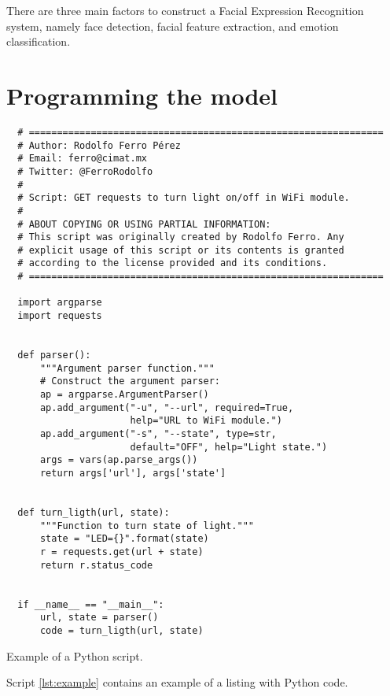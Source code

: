 {\color{Orchid} There are three main factors to construct a Facial Expression
Recognition system, namely face detection, facial feature extraction, and
emotion classification.}

\section{Programming the model}

\begin{listing}[H]
  \begin{verbatim}
  # ===============================================================
  # Author: Rodolfo Ferro Pérez
  # Email: ferro@cimat.mx
  # Twitter: @FerroRodolfo
  #
  # Script: GET requests to turn light on/off in WiFi module.
  #
  # ABOUT COPYING OR USING PARTIAL INFORMATION:
  # This script was originally created by Rodolfo Ferro. Any
  # explicit usage of this script or its contents is granted
  # according to the license provided and its conditions.
  # ===============================================================

  import argparse
  import requests


  def parser():
      """Argument parser function."""
      # Construct the argument parser:
      ap = argparse.ArgumentParser()
      ap.add_argument("-u", "--url", required=True,
                      help="URL to WiFi module.")
      ap.add_argument("-s", "--state", type=str,
                      default="OFF", help="Light state.")
      args = vars(ap.parse_args())
      return args['url'], args['state']


  def turn_ligth(url, state):
      """Function to turn state of light."""
      state = "LED={}".format(state)
      r = requests.get(url + state)
      return r.status_code


  if __name__ == "__main__":
      url, state = parser()
      code = turn_ligth(url, state)

  \end{verbatim}
  \caption{Example of a Python script.}
  \label{lst:example}
\end{listing}
Script \ref{lst:example} contains an example of a listing with Python code.

